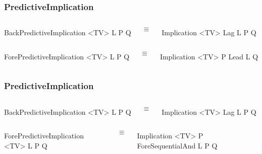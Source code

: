 \documentclass[aspectratio=169]{beamer}
\begin{document}
\begin{frame}[fragile]
  \frametitle{PredictiveImplication}

  \begin{columns}
    \column{1in}
\begin{semiverbatim}
BackPredictiveImplication <TV>
  L
  P
  Q
\end{semiverbatim}

    \column{0.5in}
    $$\equiv$$

    \column{1in}
\begin{semiverbatim}
Implication <TV>
  Lag
    L
    P
  Q
\end{semiverbatim}

  \end{columns}

    \begin{columns}
    \column{1in}
\begin{semiverbatim}
ForePredictiveImplication <TV>
  L
  P
  Q
\end{semiverbatim}

    \column{0.5in}
    $$\equiv$$

    \column{1in}
\begin{semiverbatim}
Implication <TV>
  P
  Lead
    L
    Q
\end{semiverbatim}

  \end{columns}

\end{frame}

\begin{frame}[fragile]
  \frametitle{PredictiveImplication}

  \begin{columns}
    \column{1in}
\begin{semiverbatim}
BackPredictiveImplication <TV>
  L
  P
  Q
\end{semiverbatim}

    \column{0.5in}
    $$\equiv$$

    \column{1in}
\begin{semiverbatim}
Implication <TV>
  Lag
    L
    P
  Q
\end{semiverbatim}

  \end{columns}

    \begin{columns}
    \column{1in}
\begin{semiverbatim}
ForePredictiveImplication <TV>
  L
  P
  Q
\end{semiverbatim}

    \column{0.5in}
    $$\equiv$$

    \column{1in}
\begin{semiverbatim}
Implication <TV>
  P
  ForeSequentialAnd
    L
    P
    Q
\end{semiverbatim}

  \end{columns}

\end{frame}
\end{document}
